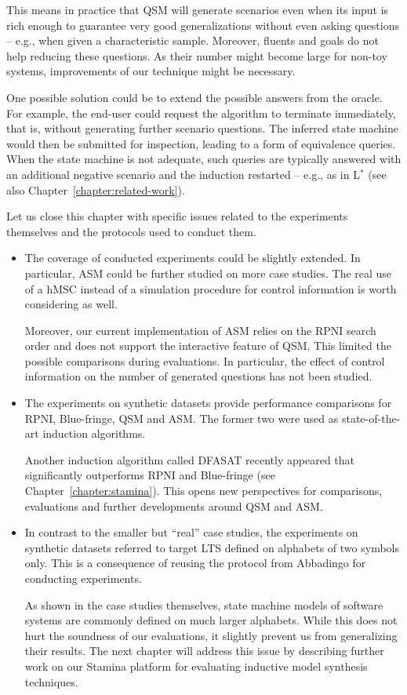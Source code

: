\begin{itemize}
This means in practice that QSM will generate scenarios even when its input is rich enough to guarantee very good generalizations without even asking questions -- e.g., when given a characteristic sample. Moreover, fluents and goals do not help reducing these questions. As their number might become large for non-toy systems, improvements of our technique might be necessary.

One possible solution could be to extend the possible answers from the oracle. For example, the end-user could request  the algorithm to terminate immediately, that is, without generating further scenario questions. The inferred state machine would then be submitted for inspection, leading to a form of equivalence queries. When the state machine is not adequate, such queries are typically answered with an additional negative scenario and the induction restarted -- e.g., as in L$^*$ \cite{Angluin:1987} (see also Chapter~\ref{chapter:related-work}).

\end{itemize}

Let us close this chapter with specific issues related to the experiments themselves and the protocols used to conduct them. 
\begin{itemize}

\item The coverage of conducted experiments could be slightly extended. In particular, ASM could be further studied on more case studies. The real use of a hMSC instead of a simulation procedure for control information is worth considering as well.

Moreover, our current implementation of ASM relies on the RPNI search order and does not support the interactive feature of QSM. This limited the possible comparisons during evaluations. In particular, the effect of control information on the number of generated questions has not been studied.

\item The experiments on synthetic datasets provide performance comparisons for RPNI, Blue-fringe, QSM and ASM. The former two were used as state-of-the-art induction algorithms. 

Another induction algorithm called DFASAT recently appeared that significantly outperforms RPNI and Blue-fringe \cite{Heule:2010} (see Chapter~\ref{chapter:stamina}). This opens new perspectives for comparisons, evaluations and further developments around QSM and ASM. 

\item In contrast to the smaller but ``real'' case studies, the experiments on synthetic datasets referred to target LTS defined on alphabets of two symbols only. This is a consequence of reusing the protocol from Abbadingo for conducting experiments. 

As shown in the case studies themselves, state machine models of software systems are commonly defined on much larger alphabets. While this does not hurt the soundness of our evaluations, it slightly prevent us from generalizing their results. The next chapter will address this issue by describing further work on our Stamina platform for evaluating inductive model synthesis techniques.
\end{itemize}
